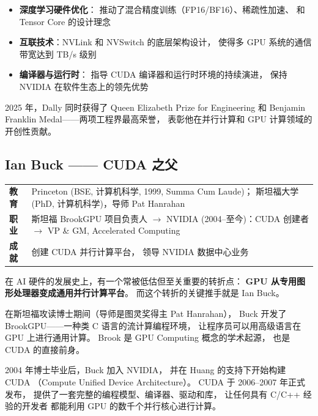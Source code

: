 \begin{itemize}[noitemsep]
  \item \textbf{深度学习硬件优化}：
        推动了混合精度训练（FP16/BF16）、稀疏性加速、
        和 Tensor Core 的设计理念
  \item \textbf{互联技术}：NVLink 和 NVSwitch 的底层架构设计，
        使得多 GPU 系统的通信带宽达到 TB/s 级别
  \item \textbf{编译器与运行时}：
        指导 CUDA 编译器和运行时环境的持续演进，
        保持 NVIDIA 在软件生态上的领先优势
\end{itemize}

2025 年，Dally 同时获得了 Queen Elizabeth Prize for Engineering
和 Benjamin Franklin Medal——两项工程界最高荣誉，
表彰他在并行计算和 GPU 计算领域的开创性贡献。

\subsection{Ian Buck —— CUDA 之父}
\label{subsec:ian-buck}

\begin{keybox}
\small
\begin{tabularx}{\textwidth}{lX}
\toprule
\textbf{教育} & Princeton (BSE, 计算机科学, 1999, Summa Cum Laude)；
                斯坦福大学 (PhD, 计算机科学)，导师 Pat Hanrahan \\
\textbf{职业} & 斯坦福 BrookGPU 项目负责人 $\to$
                NVIDIA (2004--至今)：CUDA 创建者 $\to$
                VP \& GM, Accelerated Computing \\
\textbf{成就} & 创建 CUDA 并行计算平台，
                领导 NVIDIA 数据中心业务 \\
\bottomrule
\end{tabularx}
\end{keybox}

在 AI 硬件的发展史上，有一个常被低估但至关重要的转折点：
\textbf{GPU 从专用图形处理器变成通用并行计算平台}。
而这个转折的关键推手就是 Ian Buck。

在斯坦福攻读博士期间（导师是图灵奖得主 Pat Hanrahan），
Buck 开发了 BrookGPU——一种类 C 语言的流计算编程环境，
让程序员可以用高级语言在 GPU 上进行通用计算。
Brook 是 GPU Computing 概念的学术起源，
也是 CUDA 的直接前身。

2004 年博士毕业后，Buck 加入 NVIDIA，
并在 Huang 的支持下开始构建 CUDA
（Compute Unified Device Architecture）。
CUDA 于 2006--2007 年正式发布，
提供了一套完整的编程模型、编译器、驱动和库，
让任何具有 C/C++ 经验的开发者
都能利用 GPU 的数千个并行核心进行计算。

